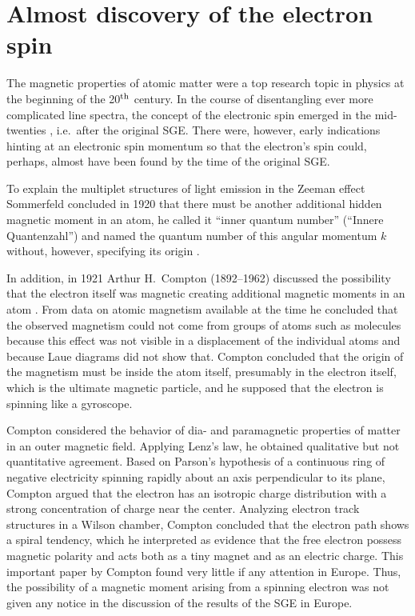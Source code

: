 \documentclass[12pt]{article}
\begin{document}
\section{Almost discovery of the electron spin}

The magnetic properties of atomic matter were a top research topic in physics at the beginning of the 20$^{\rm th}$ century. In the course of disentangling ever more complicated line spectra, the concept of the electronic spin emerged in the mid-twenties \citep{TomonagaS1997Story}, i.e.\ after the original SGE. There were, however, early indications hinting at an electronic spin momentum so that the electron's spin could, perhaps, almost have been found by the time of the original SGE.

To explain the multiplet structures of light emission in the Zeeman effect Sommerfeld concluded in 1920 that there must be another additional hidden magnetic moment in an atom, he called it ``inner quantum number'' (``Innere Quantenzahl'') and named the quantum number of this angular momentum $k$ without, however, specifying its origin \citep{SommerfeldA1920Zahlenmysterium,SommerfeldA1920Gesetze}. 

In addition, in 1921 Arthur H.~Compton (1892--1962) discussed the possibility that the electron itself was magnetic creating additional magnetic moments in an atom \citep{ComptonAH1921electron,StuewerR1975Effect}. From data on atomic magnetism available at the time he concluded that the observed magnetism could not come from groups of atoms such as molecules because this effect was not visible in a displacement of the individual atoms and because Laue diagrams did not show that. Compton concluded that the origin of the magnetism must be inside the atom itself, presumably in the electron itself, which is the ultimate magnetic particle, and he supposed that the electron is spinning like a gyroscope.

Compton considered the behavior of dia- and paramagnetic properties of matter in an outer magnetic field. Applying Lenz's law, he obtained qualitative but not quantitative agreement. Based on Parson's hypothesis \citep{ParsonA1915Theory} of a continuous ring of negative electricity spinning rapidly about an axis perpendicular to its plane, Compton argued that the electron has an isotropic charge distribution with a strong concentration of charge near the center. Analyzing electron track structures in a Wilson chamber, Compton concluded that the electron path shows a spiral tendency, which he interpreted as evidence that the free electron possess magnetic polarity and acts both as a tiny magnet and as an electric charge. This important paper by Compton found very little if any attention in Europe. Thus, the possibility of a magnetic moment arising from a spinning electron was not given any notice in the discussion of the results of the SGE in Europe. 
\end{document}
